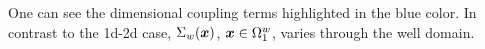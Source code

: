 One can see the dimensional coupling terms highlighted in the blue color.
In contrast to the 1d-2d case, $\Sigma_w(\mathbf{\boldsymbol{x}})$, $\mathbf{\boldsymbol{x}}\in\Omega^w_1$, varies through the well domain.

